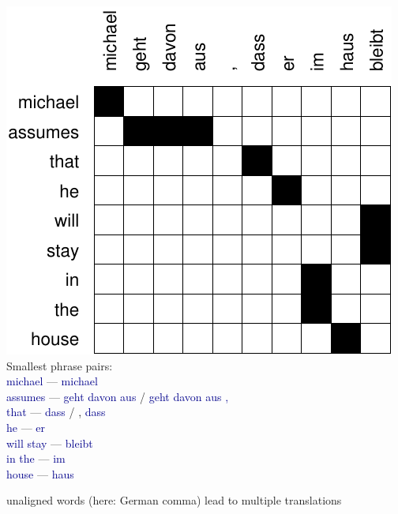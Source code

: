 \documentclass[landscape]{slides}
\newcommand{\example}[1]{\textcolor{darkblue}{\rm #1}}
\begin{document}
\begin{center}
\includegraphics[scale=1]{michael-alignment.pdf}\\

Smallest phrase pairs:\\
{\footnotesize 
\example{michael} --- \example{michael} \\
\example{assumes} --- \example{geht davon aus} / \example{geht davon aus ,} \\
\example{that} --- \example{dass} / , \example{dass} \\
\example{he} --- \example{er}  \\
\example{will stay} --- \example{bleibt} \\
\example{in the} --- \example{im} \\
\example{house} --- \example{haus}\\}

unaligned words (here: German comma) lead to multiple translations
\end{center}


\end{document}
